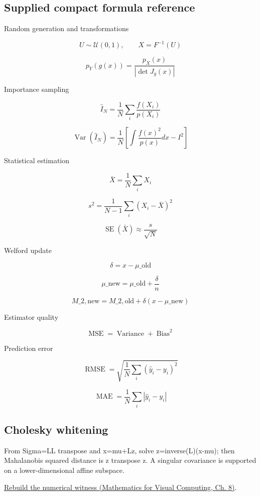 \subsection{Supplied compact formula reference}\label{appendix-cb5af353ef77-supplied-compact-formula-reference}

Random generation and transformations

\[
 U\sim\mathcal U(0,1),\qquad X=F^{-1}(U) 
\]

\[
 p_Y(g(x)) = \frac{p_X(x)}{|\det J_g(x)|} 
\]

Importance sampling

\[
 \widehat I_N= \frac1N\sum_i\frac{f(X_i)}{p(X_i)} 
\]

\[
 \operatorname{Var}(\widehat I_N) = \frac1N \left[ \int\frac{f(x)^2}{p(x)}dx-I^2 \right] 
\]

Statistical estimation

\[
 \bar X=\frac1N\sum_iX_i 
\]

\[
 s^2=\frac1{N-1}\sum_i(X_i-\bar X)^2 
\]

\[
 \operatorname{SE}(\bar X)\approx\frac{s}{\sqrt N} 
\]

Welford update

\[
 \delta=x-\mu\_{\mathrm{old}} 
\]

\[
 \mu\_{\mathrm{new}}= \mu\_{\mathrm{old}}+\frac{\delta}{n} 
\]

\[
 M\_{2,\mathrm{new}}= M\_{2,\mathrm{old}}+ \delta(x-\mu\_{\mathrm{new}}) 
\]

Estimator quality

\[
 \operatorname{MSE}= \operatorname{Variance}+ \operatorname{Bias}^2 
\]

Prediction error

\[
 \operatorname{RMSE}= \sqrt{\frac1N\sum_i(\hat y_i-y_i)^2} 
\]

\[
 \operatorname{MAE}= \frac1N\sum_i|\hat y_i-y_i| 
\]

\subsection{Cholesky whitening}\label{appendix-cb5af353ef77-cholesky-whitening}

From Sigma=LL transpose and x=mu+Lz, solve z=inverse(L)(x-mu); then Mahalanobis squared distance is z transpose z. A singular covariance is supported on a lower-dimensional affine subspace.

\href{../02-Mathematics-for-Visual-Computing/main.pdf\#nameddest=02-foundations-ii-ch024-original-bridge-whiten-a-covariance-ellipse}{Rebuild the numerical witness (Mathematics for Visual Computing, Ch. 8)}.

